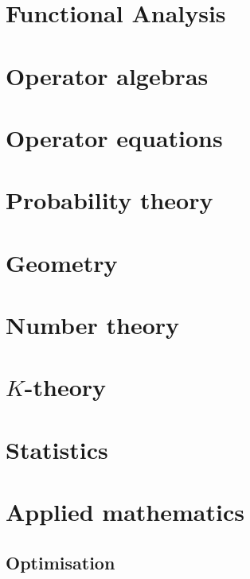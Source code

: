 \documentclass{report}
\begin{document}
\part{Functional Analysis}
\setcounter{chapter}{0} %


\part{Operator algebras}
\setcounter{chapter}{0} %


\part{Operator equations}
\setcounter{chapter}{0} %


\part{Probability theory}
\setcounter{chapter}{0} %


\part{Geometry}
\setcounter{chapter}{0} %


\part{Number theory}
\setcounter{chapter}{0} %


\part{$K$-theory}
\setcounter{chapter}{0} %


\part{Statistics}
\setcounter{chapter}{0} %


\part{Applied mathematics}
\setcounter{chapter}{0} %
\chapter{Optimisation}

\end{document}
